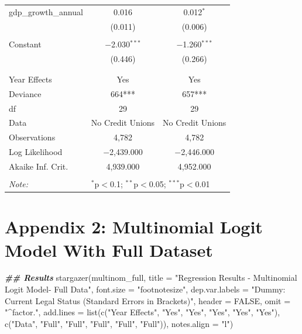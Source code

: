 \documentclass[a4paper,nobind]{templates/ociamthesis}
\newenvironment{Shaded}{\begin{snugshade}}{\end{snugshade}}
\newcommand{\AttributeTok}[1]{\textcolor[rgb]{0.77,0.63,0.00}{#1}}
\newcommand{\ConstantTok}[1]{\textcolor[rgb]{0.00,0.00,0.00}{#1}}
\newcommand{\DocumentationTok}[1]{\textcolor[rgb]{0.56,0.35,0.01}{\textbf{\textit{#1}}}}
\newcommand{\FunctionTok}[1]{\textcolor[rgb]{0.00,0.00,0.00}{#1}}
\newcommand{\NormalTok}[1]{#1}
\newcommand{\StringTok}[1]{\textcolor[rgb]{0.31,0.60,0.02}{#1}}
\renewenvironment{Shaded}
{
  \vspace{10pt}%
  \begin{snugshade}%
}{%
  \end{snugshade}%
  \vspace{8pt}%
}
\begin{document}
\begin{table}[!htbp]
\begin{tabular}{@{\extracolsep{5pt}}lcc}
 gdp\_growth\_annual & 0.016 & 0.012$^{*}$ \\ 
  & (0.011) & (0.006) \\ 
  & & \\ 
 Constant & $-$2.030$^{***}$ & $-$1.260$^{***}$ \\ 
  & (0.446) & (0.266) \\ 
  & & \\ 
\hline \\[-1.8ex] 
Year Effects & Yes & Yes \\ 
Deviance & 664*** & 657*** \\ 
df & 29 & 29 \\ 
Data & No Credit Unions & No Credit Unions \\ 
Observations & 4,782 & 4,782 \\ 
Log Likelihood & $-$2,439.000 & $-$2,446.000 \\ 
Akaike Inf. Crit. & 4,939.000 & 4,952.000 \\ 
\hline 
\hline \\[-1.8ex] 
\textit{Note:}  & \multicolumn{2}{l}{$^{*}$p$<$0.1; $^{**}$p$<$0.05; $^{***}$p$<$0.01} \\ 
\end{tabular} 
\end{table}

\newpage

\hypertarget{appendix-2-multinomial-logit-model-with-full-dataset}{%
\section{Appendix 2: Multinomial Logit Model With Full Dataset}\label{appendix-2-multinomial-logit-model-with-full-dataset}}

\begin{Shaded}
\begin{Highlighting}[]
\DocumentationTok{\#\# Results }
\FunctionTok{stargazer}\NormalTok{(multinom\_full, }\AttributeTok{title =} \StringTok{"Regression Results {-} Multinomial Logit Model{-} Full Data"}\NormalTok{, }\AttributeTok{font.size =} \StringTok{"footnotesize"}\NormalTok{, }\AttributeTok{dep.var.labels =} \StringTok{"Dummy: Current Legal Status (Standard Errors in Brackets)"}\NormalTok{, }\AttributeTok{header =} \ConstantTok{FALSE}\NormalTok{, }\AttributeTok{omit =} \StringTok{"\^{}factor."}\NormalTok{, }\AttributeTok{add.lines =} \FunctionTok{list}\NormalTok{(}\FunctionTok{c}\NormalTok{(}\StringTok{"Year Effects"}\NormalTok{, }\StringTok{"Yes"}\NormalTok{, }\StringTok{"Yes"}\NormalTok{, }\StringTok{"Yes"}\NormalTok{, }\StringTok{"Yes"}\NormalTok{, }\StringTok{"Yes"}\NormalTok{), }\FunctionTok{c}\NormalTok{(}\StringTok{"Data"}\NormalTok{, }\StringTok{"Full"}\NormalTok{, }\StringTok{"Full"}\NormalTok{, }\StringTok{"Full"}\NormalTok{, }\StringTok{"Full"}\NormalTok{, }\StringTok{"Full"}\NormalTok{)), }\AttributeTok{notes.align =} \StringTok{"l"}\NormalTok{)}
\end{Highlighting}
\end{Shaded}
\end{document}
